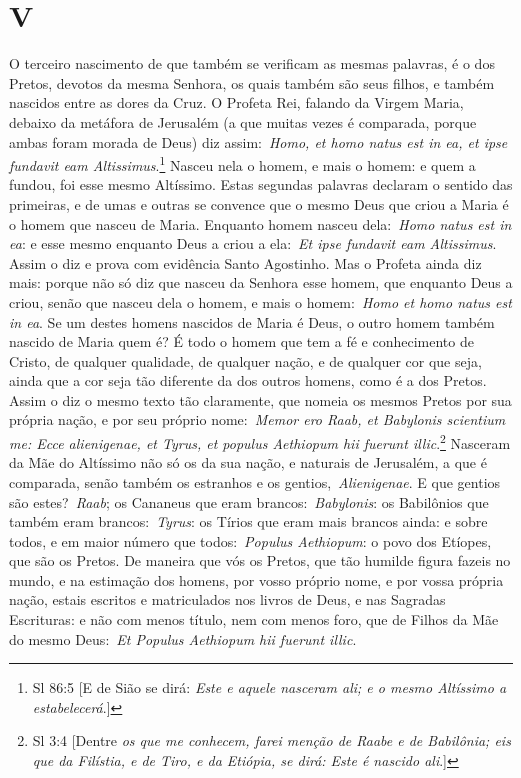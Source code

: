 \section*{V}

O terceiro nascimento de que também se verificam as mesmas
palavras, é o dos Pretos, devotos da mesma Senhora, os quais também são
seus filhos, e também nascidos entre as dores da Cruz. O Profeta Rei,
falando da Virgem Maria, debaixo da metáfora de Jerusalém (a que muitas
vezes é comparada, porque ambas foram morada de Deus) diz
assim:~\emph{Homo, et homo natus est in ea, et ipse fundavit eam
Altissimus}.\footnote{Sl 86:5 [E de Sião se dirá: \textit{Este e aquele nasceram ali; e o mesmo Altíssimo a estabelecerá}.]} Nasceu nela o homem, e mais o homem: e
quem a fundou, foi esse mesmo Altíssimo. Estas segundas palavras
declaram o sentido das primeiras, e de umas e outras se convence que o
mesmo Deus que criou a Maria é o homem que nasceu de Maria. Enquanto
homem nasceu dela:~\emph{Homo natus est in ea}: e esse mesmo enquanto
Deus a criou a ela:~\emph{Et ipse fundavit eam Altissimus}. Assim o diz
e prova com evidência Santo Agostinho. Mas o Profeta ainda diz mais:
porque não só diz que nasceu da Senhora esse homem, que enquanto Deus a
criou, senão que nasceu dela o homem, e mais o homem:~\emph{Homo et homo
natus est in ea}. Se um destes homens nascidos de Maria é Deus, o outro
homem também nascido de Maria quem é? É todo o homem que tem a fé e
conhecimento de Cristo, de qualquer qualidade, de qualquer nação, e de
qualquer cor que seja, ainda que a cor seja tão diferente da dos outros
homens, como é a dos Pretos. Assim o diz o mesmo texto tão claramente,
que nomeia os mesmos Pretos por sua própria nação, e por seu próprio
nome:~\emph{Memor ero Raab, et Babylonis scientium me: Ecce alienigenae,
et Tyrus, et populus Aethiopum hii fuerunt illic}.\footnote{Sl 3:4 [Dentre \textit{os que me conhecem, farei menção de Raabe e de Babilônia; eis que da Filístia, e
de Tiro, e da Etiópia, se dirá: Este é nascido ali}.]}
Nasceram da Mãe do Altíssimo não só os da sua nação, e naturais de
Jerusalém, a que é comparada, senão também os estranhos e os
gentios,~\emph{Alienigenae}. E que gentios são estes?~\emph{Raab}; os
Cananeus que eram brancos:~\emph{Babylonis}: os Babilônios que também
eram brancos:~\emph{Tyrus}: os Tírios que eram mais brancos ainda: e
sobre todos, e em maior número que todos:~\emph{Populus Aethiopum}: o
povo dos Etíopes, que são os Pretos. De maneira que vós os Pretos, que
tão humilde figura fazeis no mundo, e na estimação dos homens, por vosso
próprio nome, e por vossa própria nação, estais escritos e matriculados
nos livros de Deus, e nas Sagradas Escrituras: e não com menos título,
nem com menos foro, que de Filhos da Mãe do mesmo Deus:~\emph{Et Populus
Aethiopum hii fuerunt illic}.


